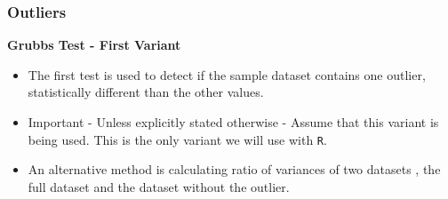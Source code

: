 \documentclass{beamer}
\begin{document}
\begin{frame}[fragile]
	\frametitle{Outliers}
	\Large
	\textbf{Grubbs Test - First Variant}\\
	
	
	\begin{itemize}
		\item The first test is used to detect if the sample dataset contains one outlier, statistically different than
		the other values. 
		\item Important - Unless explicitly stated otherwise - Assume that this variant is being used. This is the only variant we will use with \texttt{R}.
		\item  An alternative method is calculating ratio of
		variances of two datasets , the full dataset and the dataset without the outlier.
	\end{itemize}
\end{frame}
\end{document}
